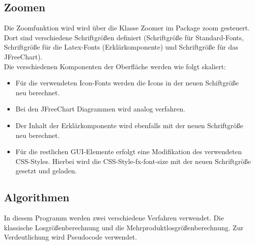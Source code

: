 \documentclass[12pt,a4paper, listof=entryprefix, bibliography=totocnumbered,toc=listofnumbered,lof=listofnumbered]{scrartcl}
\begin{document}
\subsection{Zoomen}
Die Zoomfunktion wird wird über die Klasse Zoomer im Package zoom gesteuert. Dort sind verschiedene Schriftgrößen definiert (Schriftgröße für Standard-Fonts, Schriftgröße für die Latex-Fonts (Erklärkomponente) und Schriftgröße für das JFreeChart).
\\
Die verschiedenen Komponenten der Oberfläche werden wie folgt skaliert:
\begin{itemize}
	\item Für die verwendeten Icon-Fonts werden die Icons in der neuen Schiftgröße neu berechnet.
	\item Bei den JFreeChart Diagrammen wird analog verfahren.
	\item Der Inhalt der Erklärkomponente wird ebenfalls mit der neuen Schriftgröße neu berechnet.
	\item Für die restlichen \gls{GUI}-Elemente erfolgt eine Modifikation des verwendeten CSS-Styles. Hierbei wird die \gls{CSS}-Style-fx-font-size mit der neuen Schriftgröße gesetzt und geladen.
\end{itemize}

\subsection{Algorithmen}
In diesem Programm werden zwei verschiedene Verfahren verwendet. Die klassische Losgrößenberechnung und die Mehrproduktlosgrößenberechnung. Zur Verdeutlichung wird Pseudocode verwendet.
\end{document}

